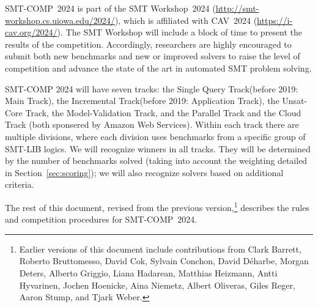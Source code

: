 \documentclass[12pt]{article}
\newcommand{\maintrack}{Single Query Track\xspace}
\newcommand{\inctrack}{Incremental Track\xspace}
\newcommand{\ucoretrack}{Unsat-Core Track\xspace}
\newcommand{\mvaltrack}{Model-Validation Track\xspace}
\newcommand{\paralleltrack}{Parallel Track\xspace}
\newcommand{\cloudtrack}{Cloud Track\xspace}
\begin{document}
SMT-COMP~2024 is part of the SMT Workshop~2024
(\url{http://smt-workshop.cs.uiowa.edu/2024/}),
which is affiliated with CAV~2024 (\url{https://i-cav.org/2024/}).
The SMT Workshop will include a block of time to present the results of the
competition.
%
Accordingly, researchers are highly encouraged to submit both new
benchmarks and new or improved solvers to raise the level of
competition and advance the state of the art in automated SMT problem
solving.

SMT-COMP 2024 will have seven tracks: the \maintrack (before 2019: Main Track),
the \inctrack (before 2019: Application Track), the \ucoretrack, the \mvaltrack,
and the \paralleltrack{} and the \cloudtrack{} (both sponsered by Amazon Web
Services).
%
Within each track there are multiple divisions, where each division
uses benchmarks from a specific group of SMT-LIB logics.
%
We will recognize winners in all tracks.
%
They will be determined by the number of benchmarks solved (taking into account
the weighting detailed in Section~\ref{sec:scoring}); we will also recognize
solvers based on additional criteria.

The rest of this document, revised from the previous
version,\footnote{Earlier versions of this document include
  contributions from Clark Barrett, Roberto Bruttomesso, David Cok,
  Sylvain Conchon, David D{\'e}harbe, Morgan Deters, Alberto Griggio,
  Liana Hadarean,
  Matthias Heizmann, Antti Hyvarinen, Jochen Hoenicke, Aina Niemetz, Albert Oliveras, Giles Reger, Aaron Stump,
  and Tjark Weber.}  describes the rules and competition procedures for
SMT-COMP~2024.
%
\end{document}
